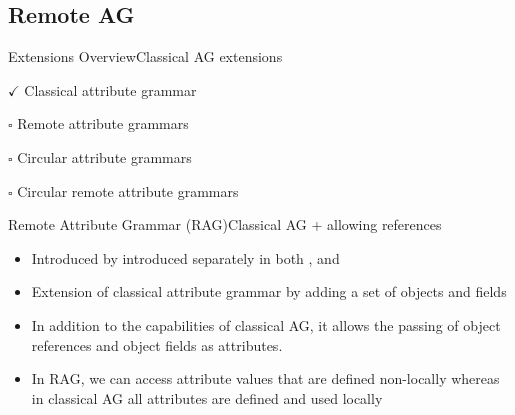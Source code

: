 \subsection*{Remote AG}{}

\begin{frame}{Extensions Overview}{Classical AG extensions}
     \begin{description}
        \item $\checkmark$ Classical attribute grammar
        \item $\square$  \alert{Remote attribute grammars}
        \item $\square$  Circular attribute grammars
        \item $\square$  Circular remote attribute grammars
    \end{description}
\end{frame}



% 
\begin{frame}{Remote Attribute Grammar (RAG)}{Classical AG + allowing references}

\begin{itemize}
    \item Introduced by introduced separately in both \cite{Boyland_1995, Boyland05remoteattribute},  and \cite{4236994589494506a212280893694207}
    \item Extension of classical attribute grammar by adding a set of \alert{objects} and \alert{fields}
    \item In addition to the capabilities of classical AG, it allows the passing of object references and object fields as attributes.
    \item In RAG, we can access attribute values that are defined \alert{non-locally} whereas in classical AG all attributes are defined and used \alert{locally}
\end{itemize}


\end{frame}







